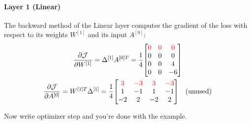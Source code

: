 \paragraph{Layer 1 (Linear)} The backward method of the Linear layer computes the gradient of the loss with respect to its weights $W^{[1]}$ and its input $A^{[0]}$:
\begin{gather*}
    \pdv{\mathcal{J}}{W^{[1]}} = \Delta^{[1]} A^{[0]T} = \frac{1}{4} \mqty[
        \color{red} 0 & \color{red} 0 & \color{red} 0 \\
        0 & 0 & 0 \\
        0 & 0 & 4 \\
        0 & 0 & -6
    ]\\
    \pdv{\mathcal{J}}{A^{[0]}} = W^{[1]T} \Delta^{[1]} = \frac{1}{4} \mqty[
        \color{red} 3 & \color{red} -3 & \color{red} 3 & \color{red} -3 \\
        1 & -1 & 1 & -1 \\
        -2 & 2 & -2 & 2
    ] \quad \text{(unused)}
\end{gather*}

{\color{red} Now write optimizer step and you're done with the example.}
